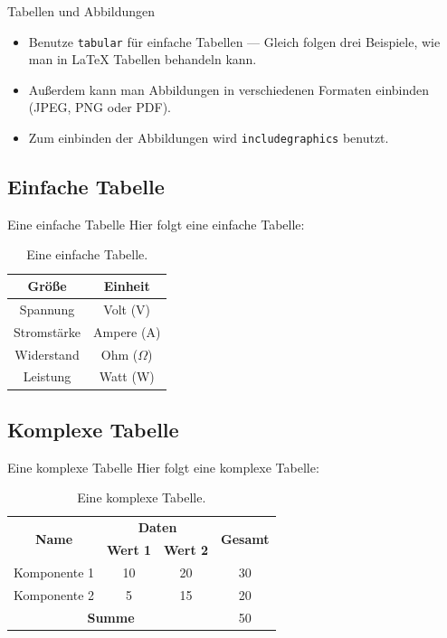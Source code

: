 
\begin{frame}{Tabellen und Abbildungen}
  \begin{itemize}
    \item Benutze \texttt{tabular} für einfache Tabellen --- Gleich folgen drei Beispiele, wie man in LaTeX Tabellen behandeln kann.
    \item Außerdem kann man Abbildungen in verschiedenen Formaten einbinden (JPEG, PNG oder PDF).
    \item Zum einbinden der Abbildungen wird \texttt{includegraphics} benutzt.
  \end{itemize}

\end{frame}



\subsection{Einfache Tabelle}

\begin{frame}{Eine einfache Tabelle}
  Hier folgt eine \alert{einfache} Tabelle:
  \begin{table}
    \centering
    \begin{tabular}{|c|c|}
      \hline
      Größe & Einheit \\
      \hline
      Spannung & Volt (V) \\
      Stromstärke & Ampere (A) \\
      Widerstand & Ohm ($\Omega$) \\
      Leistung & Watt (W) \\
      \hline
    \end{tabular}
    \caption{Eine einfache Tabelle.}
  \end{table}
\end{frame}


\subsection{Komplexe Tabelle}

\begin{frame}{Eine komplexe Tabelle}
  Hier folgt eine \alert{komplexe} Tabelle:
  \begin{table}
    \centering
    \begin{tabular}{|c|c|c|c|}
      \hline
      \multirow{2}{*}{\textbf{Name}} & \multicolumn{2}{c|}{\textbf{Daten}} & \multirow{2}{*}{\textbf{Gesamt}} \\
      \cline{2-3}
       & \textbf{Wert 1} & \textbf{Wert 2} & \\
      \hline
      Komponente 1 & 10 & 20 & 30 \\
      Komponente 2 & 5 & 15 & 20 \\
      \hline
      \multicolumn{3}{|c|}{\textbf{Summe}} & 50 \\
      \hline
    \end{tabular}
    \caption{Eine komplexe Tabelle.}
  \end{table}
\end{frame}

